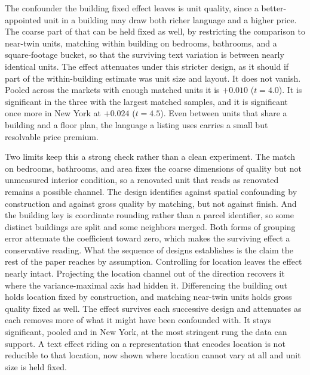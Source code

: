 The confounder the building fixed effect leaves is unit quality, since a
better-appointed unit in a building may draw both richer language and a higher
price. The coarse part of that can be held fixed as well, by restricting the
comparison to near-twin units, matching within building on bedrooms, bathrooms, and
a square-footage bucket, so that the surviving text variation is between nearly
identical units. The effect attenuates under this stricter design, as it should if
part of the within-building estimate was unit size and layout. It does not
vanish. Pooled across the markets with enough matched units it is $+0.010$
($t=4.0$). It is significant in the three with the largest matched samples, and it
is significant once more in New York at $+0.024$ ($t=4.5$). Even between units that
share a building and a floor plan, the language a listing uses carries a small but
resolvable price premium.

Two limits keep this a strong check rather than a clean experiment. The match on
bedrooms, bathrooms, and area fixes the coarse dimensions of quality but not
unmeasured interior condition, so a renovated unit that reads as renovated remains a
possible channel. The design identifies against spatial confounding by construction
and against gross quality by matching, but not against finish. And the building key
is coordinate rounding rather than a parcel identifier, so some distinct buildings
are split and some neighbors merged. Both forms of grouping error attenuate the
coefficient toward zero, which makes the surviving effect a conservative reading.
What the sequence of designs establishes is the claim the rest of the paper reaches
by assumption. Controlling for location leaves the effect nearly intact. Projecting
the location channel out of the direction recovers it where the variance-maximal
axis had hidden it. Differencing the building out holds location fixed by
construction, and matching near-twin units holds gross quality fixed as well. The
effect survives each successive design and attenuates as each removes more of what
it might have been confounded with. It stays significant, pooled and in New
York, at the most stringent rung the data can support. A text effect riding on a
representation that encodes location is not reducible to that location, now shown
where location cannot vary at all and unit size is held fixed.
